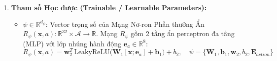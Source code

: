 \begin{enumerate}[label=\textbf{(\alph*)}]
  \item \textbf{Tham số Học được (Trainable / Learnable Parameters):}
  \begin{itemize}
    \item $\psi \in \mathbb{R}^{d_\psi}$: Vector trọng số của Mạng Nơ-ron Phần thưởng Ẩn $R_\psi(\mathbf{x}, a): \mathbb{R}^{32} \times \mathcal{A} \to \mathbb{R}$.
    Mạng $R_\psi$ gồm 2 tầng ẩn perceptron đa tầng (MLP) với lớp nhúng hành động $\mathbf{e}_a \in \mathbb{R}^8$:
    \begin{equation}\label{eq:latent-reward-net}
      R_\psi(\mathbf{x}, a) = \mathbf{w}_2^T \, \text{LeakyReLU}\Big(\mathbf{W}_1 [\mathbf{x}; \mathbf{e}_a] + \mathbf{b}_1\Big) + b_2, \quad \psi = \{\mathbf{W}_1, \mathbf{b}_1, \mathbf{w}_2, b_2, \mathbf{E}_{action}\}
    \end{equation}
  \end{itemize}
\end{enumerate}

